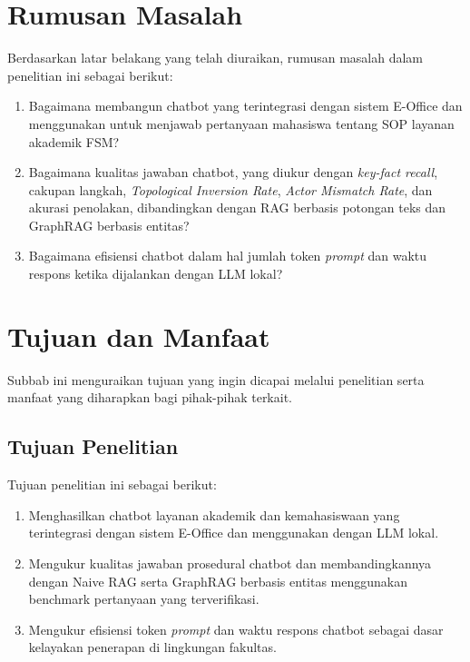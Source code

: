 \section{Rumusan Masalah}
\label{sec:rumusan}
Berdasarkan latar belakang yang telah diuraikan, rumusan masalah dalam penelitian ini sebagai berikut:
\begin{enumerate}
\item Bagaimana membangun chatbot yang terintegrasi dengan sistem E-Office dan menggunakan \wgr{} untuk menjawab pertanyaan mahasiswa tentang SOP layanan akademik FSM?
\item Bagaimana kualitas jawaban chatbot, yang diukur dengan \textit{key-fact recall}, cakupan langkah, \textit{Topological Inversion Rate}, \textit{Actor Mismatch Rate}, dan akurasi penolakan, dibandingkan dengan RAG berbasis potongan teks dan GraphRAG berbasis entitas?
\item Bagaimana efisiensi chatbot dalam hal jumlah token \textit{prompt} dan waktu respons ketika dijalankan dengan LLM lokal?
\end{enumerate}

\section{Tujuan dan Manfaat}
\label{sec:tujuan-manfaat}
Subbab ini menguraikan tujuan yang ingin dicapai melalui penelitian serta manfaat yang diharapkan bagi pihak-pihak terkait.

\subsection{Tujuan Penelitian}
Tujuan penelitian ini sebagai berikut:
\begin{enumerate}
\item Menghasilkan chatbot layanan akademik dan kemahasiswaan yang terintegrasi dengan sistem E-Office dan menggunakan \wgr{} dengan LLM lokal.
\item Mengukur kualitas jawaban prosedural chatbot dan membandingkannya dengan Naive RAG serta GraphRAG berbasis entitas menggunakan benchmark pertanyaan yang terverifikasi.
\item Mengukur efisiensi token \textit{prompt} dan waktu respons chatbot sebagai dasar kelayakan penerapan di lingkungan fakultas.
\end{enumerate}

